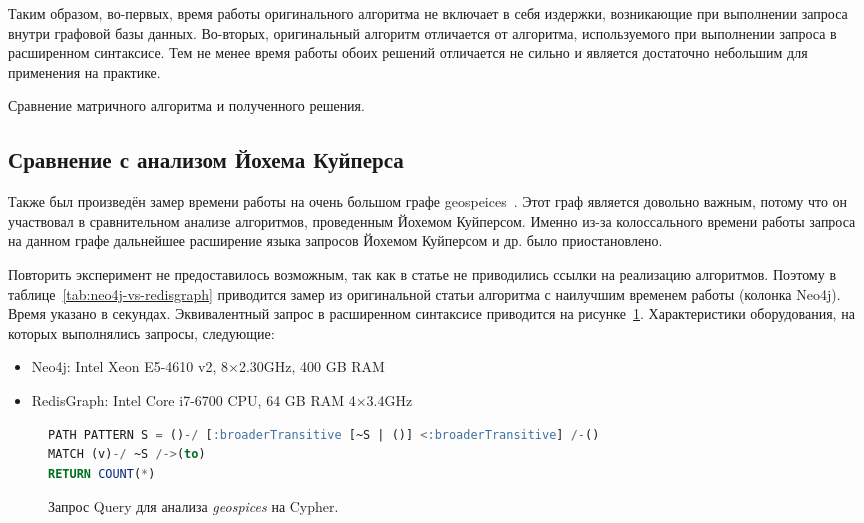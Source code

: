 Таким образом, во-первых, время работы оригинального алгоритма не включает в себя издержки, возникающие при выполнении запроса внутри графовой базы данных. Во-вторых, оригинальный алгоритм отличается от алгоритма, используемого при выполнении запроса в расширенном синтаксисе. Тем не менее время работы обоих решений отличается не сильно и является достаточно небольшим для применения на практике.
\begin{table}[h!]
\begin{adjustbox}{max width=\textwidth}

\end{adjustbox}
\caption{Сравнение матричного алгоритма и полученного решения.}
\label{tab:combinators_vs_redisgraph}
\end{table}

\subsection{Сравнение с анализом Йохема Куйперса}
Также был произведён замер времени работы на очень большом графе geospeices~\cite{geospices}. Этот граф является довольно важным, потому что он участвовал в сравнительном анализе алгоритмов, проведенным Йохемом Куйперсом. Именно из-за колоссального времени работы запроса на данном графе дальнейшее расширение языка запросов Йохемом Куйперсом и др. было приостановлено. 

Повторить эксперимент не предоставилось возможным, так как в статье не приводились ссылки на реализацию алгоритмов. Поэтому в таблице~\ref{tab:neo4j-vs-redisgraph} приводится замер из оригинальной статьи алгоритма с наилучшим временем работы (колонка Neo4j). Время указано в секундах. Эквивалентный запрос в расширенном синтаксисе приводится на рисунке~\ref{code:broaderTransitive}. Характеристики оборудования, на которых выполнялись запросы, следующие:

\begin{itemize}
    \item Neo4j: Intel Xeon E5-4610 v2, 8$\times$2.30GHz, 400 GB RAM
    \item RedisGraph: Intel Core i7-6700 CPU, 64 GB RAM 4$\times$3.4GHz
\end{itemize}

\begin{figure}[h!]
\begin{adjustbox}{max width=\textwidth}
\begin{lstlisting}[language=sql]
PATH PATTERN S = ()-/ [:broaderTransitive [~S | ()] <:broaderTransitive] /-()
MATCH (v)-/ ~S /->(to)
RETURN COUNT(*)
\end{lstlisting}
\end{adjustbox}
\caption{Запрос Query для анализа \textit{geospices} на Cypher.}
\label{code:broaderTransitive}
\end{figure}

